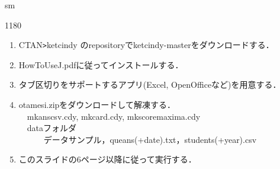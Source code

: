 \documentclass[landscape,10pt]{ujarticle}
\newcommand{\slidepage}[1][s]{%
\setcounter{ketpicctra}{18}%
\if#1m \setcounter{ketpicctra}{1}\fi
\hypersetup{linkcolor=black}%

\begin{layer}{118}{0}
\putnotee{122}{-\theketpicctra.05}{\small\thepage/\pageref{pageend}}
\end{layer}\hypersetup{linkcolor=blue}

}
\begin{document}
\def\mainslidetitley{22}
\def\ketcletter{slidecolora}
\def\ketcbox{slidecolorb}
\def\ketdbox{slidecolorc}
\def\ketcframe{slidecolord}
\def\ketcshadow{slidecolore}
\def\ketdshadow{slidecolorf}
\def\slidetitlex{6}
\def\slidetitlesize{1.3}
\def\mketcletter{slidecolori}
\def\mketcbox{yellow}
\def\mketdbox{yellow}
\def\mketcframe{yellow}
\def\mslidetitlex{62}
\def\mslidetitlesize{2}

\color{black}
\normalsize\bf\boldmath
\addtocounter{page}{-1}

\def\rad{\;\mathrm{rad}}
\newcommand{\hako}[2][6mm]{\fbox{$\mathstrut$\Ctab{#1}{#2}}}
\newcommand{\dint}{\displaystyle\int}
\newcommand{\dlim}{\displaystyle\lim}
%
\setcounter{page}{1}



\vspace*{18mm}

\slidepage
\begin{enumerate}[(1)]
\item
CTAN\verb|>|ketcindy のrepositoryでketcindy-masterをダウンロードする．
\item
HowToUseJ.pdfに従ってインストールする．
\item
タブ区切りをサポートするアプリ(Excel, OpenOfficeなど)を用意する．
\item
otamesi.zipをダウンロードして解凍する．\\
　mkanscsv.cdy, mkcard.cdy, mkscoremaxima.cdy\\
　dataフォルダ\\
　　　データサンプル，queans(+date).txt，students(+year).csv
\item
このスライドの6ページ以降に従って実行する．
\end{enumerate}



\vspace*{18mm}
\end{document}
